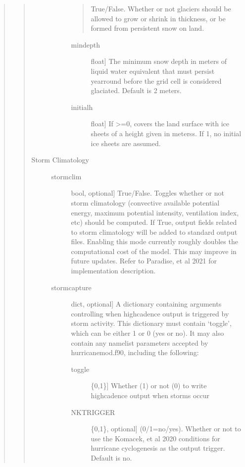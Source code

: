 \documentclass[letterpaper,10pt,english]{sphinxmanual}
\begin{document}
\begin{fulllineitems}
\begin{fulllineitems}
\begin{quote}
\begin{quote}
\begin{description}
\begin{description}
\begin{quote}
True/False. Whether or not glaciers should be allowed to grow or shrink in thickness, or be formed from persistent snow on land.
\end{quote}
\begin{description}
\item[{mindepth}] \leavevmode{[}float{]}
The minimum snow depth in meters of liquid water equivalent that must persist year\sphinxhyphen{}round before the grid cell is considered glaciated. Default is 2 meters.

\item[{initialh}] \leavevmode{[}float{]}
If \textgreater{}=0, covers the land surface with ice sheets of a height given in meterss. If \sphinxhyphen{}1, no initial ice sheets are assumed.

\end{description}

\end{description}

\item[{Storm Climatology}] \leavevmode\begin{description}
\item[{stormclim}] \leavevmode{[}bool, optional{]}
True/False. Toggles whether or not storm climatology (convective available
potential energy, maximum potential intensity, ventilation index, etc)
should be computed. If True, output fields related to storm climatology
will be added to standard output files. Enabling this mode currently roughly
doubles the computational cost of the model. This may improve in future
updates. Refer to Paradise, et al 2021 for implementation description.

\item[{stormcapture}] \leavevmode{[}dict, optional{]}
A dictionary containing arguments controlling when high\sphinxhyphen{}cadence output
is triggered by storm activity. This dictionary must contain ‘toggle’, which
can be either 1 or 0 (yes or no). It may also contain any namelist
parameters accepted by hurricanemod.f90, including the following:
\begin{description}
\item[{toggle}] \leavevmode{[}\{0,1\}{]}
Whether (1) or not (0) to write high\sphinxhyphen{}cadence output when storms occur

\item[{NKTRIGGER}] \leavevmode{[}\{0,1\}, optional{]}
(0/1=no/yes). Whether or not to use the Komacek, et al 2020 conditions for hurricane cyclogenesis as the output trigger. Default is no.


\end{description}
\end{description}
\end{description}
\end{quote}
\end{quote}
\end{fulllineitems}
\end{fulllineitems}
\end{document}
